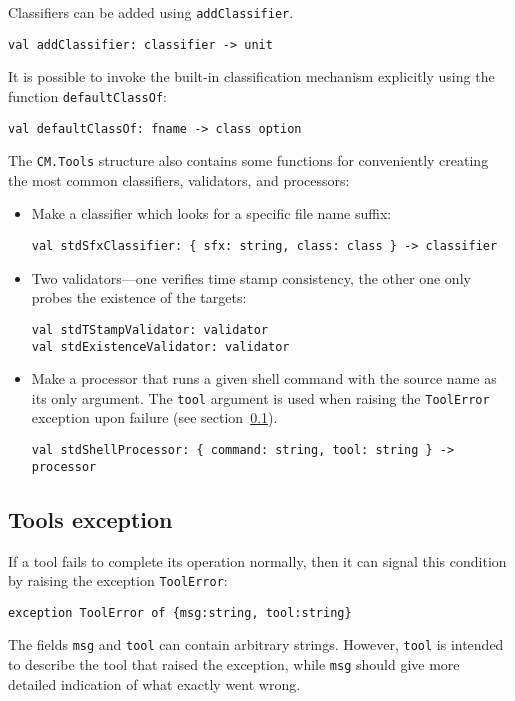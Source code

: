 \documentclass{article}
\begin{document}
Classifiers can be added using {\tt addClassifier}.
\begin{verbatim}
val addClassifier: classifier -> unit
\end{verbatim}
It is possible to invoke the built-in classification mechanism
explicitly using the function {\tt defaultClassOf}:
\begin{verbatim}
val defaultClassOf: fname -> class option
\end{verbatim}

The {\tt CM.Tools} structure also contains some functions for
conveniently creating the most common classifiers, validators, and
processors:

\begin{itemize}
\item Make a classifier which looks for a specific file name suffix:
\begin{verbatim}
val stdSfxClassifier: { sfx: string, class: class } -> classifier
\end{verbatim}
\item Two validators---one verifies time stamp consistency, the other
one only probes the existence of the targets:
\begin{verbatim}
val stdTStampValidator: validator
val stdExistenceValidator: validator
\end{verbatim}
\item Make a processor that runs a given shell command with the source
name as its only argument.  The {\tt tool} argument is used when
raising the {\tt ToolError} exception upon failure (see
section~\ref{sec:toolerror}).
\begin{verbatim}
val stdShellProcessor: { command: string, tool: string } -> processor
\end{verbatim}
\end{itemize}

\subsection{Tools exception}

\label{sec:toolerror}

If a tool fails to complete its operation normally, then it can signal
this condition by raising the exception {\tt ToolError}:
\begin{verbatim}
exception ToolError of {msg:string, tool:string}
\end{verbatim}
The fields {\tt msg} and {\tt tool} can contain arbitrary
strings. However, {\tt tool} is intended to describe the tool that
raised the exception, while {\tt msg} should give more detailed
indication of what exactly went wrong.
\end{document}
